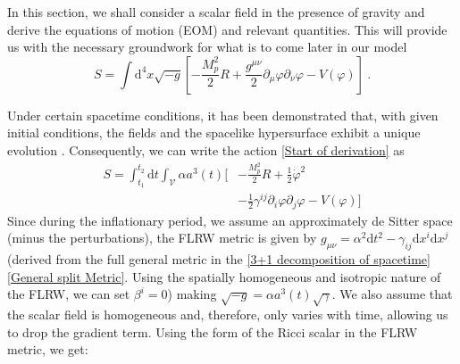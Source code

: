 \documentclass[aps,prd,reprint,preprintnumbers,showpacs,floatfix,nofootinbib,superscript address]{revtex4-2}
\newcommand{\wb}[1]{{\color[RGB]{255,0,0}{\textbf{\textit{[WB: #1]}}}}}
\begin{document}
In this section, we shall consider a scalar field in the presence of gravity and derive the equations of motion (EOM) and relevant quantities. This will provide us with the necessary groundwork for what is to come later in our model
\begin{equation}\label{Start of derivation}
    S = \int \mathrm{d}^4 x \sqrt{-g} \left[-\frac{M_p^2}{2}R+ \frac{g^{\mu \nu}}{2} \partial_{\mu}\varphi \partial_{\nu} \varphi  - V(\varphi) \right]\ .
\end{equation}

Under certain spacetime conditions, it has been demonstrated that, with given initial conditions, the fields and the spacelike hypersurface exhibit a unique evolution \cite{choquet-bruhat_global_1969}. Consequently, we can write the action \cref{Start of derivation} as
\begin{equation}
    \begin{aligned}
        S = \int_{t_1}^{t_2} \mathrm{d}t  \int_\mathcal{V}  \alpha a^3(t) \bigg[&-\frac{M_p^2}{2}R+  \frac{1}{2} \dot{\varphi}^2 \\
        &- \frac{1}{2} \gamma^{ij}\partial_{i}\varphi \partial_{j} \varphi  - V(\varphi) \bigg]  
    \end{aligned}
\end{equation}
Since during the inflationary period, we assume an approximately de Sitter space (minus the perturbations), the FLRW metric is given by $g_{\mu \nu}= \alpha^2 \text{d}t^2 - \gamma_{ij}\text{d}x^i\text{d}x^j$ (derived from the full general metric in the \cref{3+1 decomposition of spacetime} \cref{General split Metric}. Using the spatially homogeneous and isotropic nature of the FLRW, we can set $\beta^i = 0$) making $\sqrt{-g} = \alpha a^3(t) \sqrt{\gamma}$. We also assume that the scalar field is homogeneous and, therefore, only varies with time, allowing us to drop the gradient term. Using the form of the Ricci scalar in the FLRW metric, we get:
\end{document}
